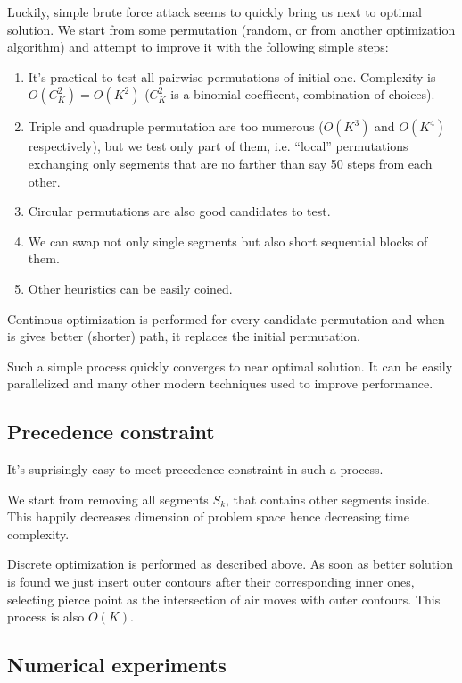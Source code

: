 \documentclass{../download/tPRS2e}
\begin{document}
Luckily,
simple brute force attack seems
to quickly bring us next to optimal solution.
We start from some permutation
(random, or from another optimization algorithm)
and attempt to improve it with the following simple steps:

\begin{enumerate}
    \item{}
    It's practical to test all pairwise permutations of initial one.
    Complexity is $O(C_K^2) = O(K^2)$
    ($C_K^2$ is a binomial coefficent, combination of choices).
    \item{}
    Triple and quadruple permutation are too numerous
    ($O(K^3)$ and $O(K^4)$ respectively),
    but we test only part of them,
    i.e. ``local'' permutations
    exchanging only segments that are no farther
    than say 50 steps from each other.
    \item{}
    Circular permutations are also good candidates to test.
    \item{}
    We can swap not only single segments but also
    short sequential blocks of them.
    \item{}
    Other heuristics can be easily coined.
\end{enumerate}

Continous optimization is performed for every candidate permutation
and when is gives better
(shorter) path,
it replaces the initial permutation.

Such a simple process quickly converges to near optimal solution.
It can be easily parallelized and many other
modern techniques used to improve performance.

\subsection{Precedence constraint}

It's suprisingly easy to meet precedence constraint in such a process.

We start from removing all segments $S_k$,
that contains other segments inside.
This happily decreases dimension of problem space
hence decreasing time complexity.

Discrete optimization is performed as described above.
As soon as better solution is found we just
insert outer contours after their corresponding inner ones,
selecting pierce point as the intersection of air moves with
outer contours.
This process is also $O(K)$.

\subsection{Numerical experiments}
\end{document}
